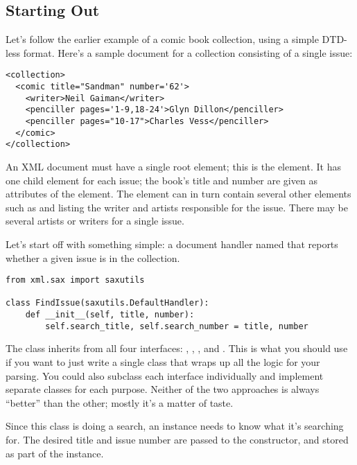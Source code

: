 \documentclass{howto}
\newcommand{\element}[1]{\code{#1}}
\begin{document}
\subsection{Starting Out}

Let's follow the earlier example of a comic book collection, using a
simple DTD-less format. Here's a sample document for a collection
consisting of a single issue:

\begin{verbatim}
<collection>
  <comic title="Sandman" number='62'>
    <writer>Neil Gaiman</writer>
    <penciller pages='1-9,18-24'>Glyn Dillon</penciller>
    <penciller pages="10-17">Charles Vess</penciller>
  </comic>
</collection>
\end{verbatim}

An XML document must have a single root element; this is the
 element.  It has one child \element{comic} element
for each issue; the book's title and number are given as attributes of
the \element{comic} element.  The \element{comic} element can in turn
contain several other elements such as \element{writer} and
\element{penciller} listing the writer and artists responsible for the
issue.  There may be several artists or writers for a single issue.

Let's start off with something simple: a document handler named
 that reports whether a given issue is in the
collection.

\begin{verbatim}
from xml.sax import saxutils

class FindIssue(saxutils.DefaultHandler):
    def __init__(self, title, number):
        self.search_title, self.search_number = title, number
\end{verbatim}

The  class inherits from all four interfaces:
, , ,
and .  This is what you should use if you want to
just write a single class that wraps up all the logic for your
parsing.  You could also subclass each interface individually and
implement separate classes for each purpose.  Neither of the two
approaches is always ``better'' than the other; mostly it's a matter
of taste.

Since this class is doing a search, an instance needs to know what
it's searching for.  The desired title and issue number are passed to
the  constructor, and stored as part of the instance.
\end{document}
